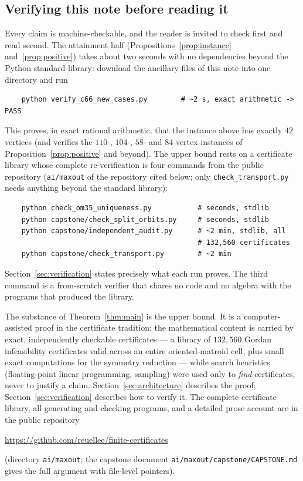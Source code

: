 \documentclass[11pt]{amsart}
\theoremstyle{remark}
\begin{document}
\subsection*{Verifying this note before reading it}
Every claim is machine-checkable, and the reader is invited to check
first and read second. The attainment half
(Propositions~\ref{prop:instance} and~\ref{prop:positive}) takes about
two seconds with no dependencies beyond the Python standard library:
download the ancillary files of this note into one directory and run
\begin{verbatim}
    python verify_c66_new_cases.py        # ~2 s, exact arithmetic -> PASS
\end{verbatim}
This proves, in exact rational arithmetic, that the instance above has
exactly $42$ vertices (and verifies the $110$-, $104$-, $58$- and
$84$-vertex instances of Proposition~\ref{prop:positive} and beyond).
The upper bound rests on a certificate library whose complete
re-verification is four commands from the public repository
(\texttt{ai/maxout} of the repository cited below; only
\texttt{check\_transport.py} needs anything beyond the standard
library):
\begin{verbatim}
    python check_om35_uniqueness.py           # seconds, stdlib
    python capstone/check_split_orbits.py     # seconds, stdlib
    python capstone/independent_audit.py      # ~2 min, stdlib, all
                                              # 132,560 certificates
    python capstone/check_transport.py        # ~2 min
\end{verbatim}
Section~\ref{sec:verification} states precisely what each run proves.
The third command is a from-scratch verifier that shares no code and no
algebra with the programs that produced the library.

The substance of Theorem~\ref{thm:main} is the upper bound. It is a
computer-assisted proof in the certificate tradition: the mathematical
content is carried by exact, independently checkable certificates --- a
library of $132{,}560$ Gordan infeasibility certificates valid across
an entire oriented-matroid cell, plus small exact computations for the
symmetry reduction --- while search heuristics (floating-point linear
programming, sampling) were used only to \emph{find} certificates,
never to justify a claim. Section~\ref{sec:architecture} describes the
proof; Section~\ref{sec:verification} describes how to verify it. The
complete certificate library, all generating and checking programs, and
a detailed prose account are in the public repository
\begin{center}
\url{https://github.com/reuellee/finite-certificates}
\end{center}
(directory \texttt{ai/maxout}; the capstone document
\texttt{ai/maxout/capstone/CAPSTONE.md} gives the full argument with
file-level pointers).
\end{document}
